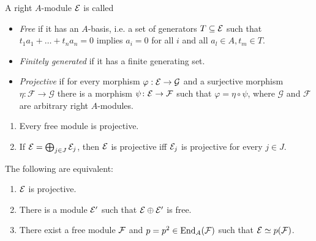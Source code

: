 \begin{definition}
 A right $A$-module $\mathcal{E}$ is called
 \begin{itemize}
  \item \emph{Free} if it has an $A$-basis, i.e. a set of generators $T\subseteq\mathcal{E}$ such that $t_1a_1+\ldots+t_na_n=0$ implies $a_i=0$ for all $i$ and all $a_l\in A,t_m\in T$.
  \item \emph{Finitely generated} if it has a finite generating set.
  \item \emph{Projective} if for every morphism $\varphi:\mathcal{E}\to\mathcal G$ and a surjective morphism $\eta\colon\mathcal F\to\mathcal G$ there is a morphism $\psi\colon\mathcal{E}\to\mathcal F$ such that $\varphi=\eta\circ\psi$, where $\mathcal G$ and $\mathcal F$ are arbitrary right $A$-modules.
 \end{itemize} 
\end{definition}

\begin{lemma}\noindent 
 \begin{enumerate} \label{lemma: free}
  \item Every free module is projective.
  \item If $\mathcal{E}=\bigoplus_{j\in J}\mathcal{E}_j$, then $\mathcal{E}$ is projective iff $\mathcal{E}_j$ is projective for every $j\in J$.
 \end{enumerate}
\end{lemma}

\begin{proposition} 
The following are equivalent:
 \begin{enumerate}
  \item $\mathcal{E}$ is projective.
  \item There is a module $\mathcal{E}'$ such that $\mathcal{E}\oplus\mathcal{E}'$ is free.
  \item There exist a free module $\mathcal{F}$ and $p=p^2\in\mathrm{End}_A(\mathcal{F})$ such that $\mathcal{E}\simeq p(\mathcal{F})$.
 \end{enumerate}
\end{proposition}

